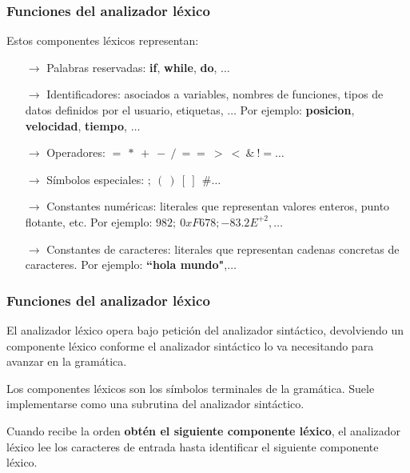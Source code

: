 \documentclass{beamer}
\begin{document}
		\begin{frame}
			\frametitle{Funciones del analizador l\'exico}

			\begin{block}{Estos componentes l\'exicos representan:}
			  \begin{itemize}
			      \item[$\rightarrow$] Palabras reservadas: \textbf{if}, \textbf{while}, \textbf{do}, $\ldots$
			      \item[$\rightarrow$] Identificadores: asociados a variables, nombres de funciones, tipos de datos definidos por el usuario, etiquetas, $\ldots$ Por ejemplo: \textbf{posicion}, \textbf{velocidad}, \textbf{tiempo}, $\ldots$
			      \item[$\rightarrow$] Operadores: $=~*~+~-~/~==~>~<~\&~!=\ldots$
			      \item[$\rightarrow$] S\'imbolos especiales: $;~(~)~[~]~{~}\#\ldots$
			      \item[$\rightarrow$] Constantes num\'ericas: literales que representan valores enteros, punto flotante, etc. Por ejemplo: $982;~0xF678;-83.2E^{+2},\ldots$
			      \item[$\rightarrow$] Constantes de caracteres: literales que representan cadenas concretas de caracteres. Por ejemplo: \textbf{``hola mundo"},$\ldots$
			  \end{itemize}
			\end{block}
		\end{frame}
		
		\begin{frame}
			\frametitle{Funciones del analizador l\'exico}

            \begin{block}{}
                El analizador l\'exico opera bajo petici\'on del analizador sint\'actico, devolviendo un componente l\'exico conforme el analizador sint\'actico lo va necesitando para avanzar en la gram\'atica.
            \end{block}
			\begin{block}{}
                Los componentes l\'exicos son los s\'imbolos terminales de la gram\'atica. Suele implementarse como una subrutina del analizador sint\'actico. 
            \end{block}
            \begin{block}{}
                Cuando recibe la orden \textbf{obt\'en el siguiente componente l\'exico}, el analizador l\'exico lee los caracteres de entrada hasta identificar el siguiente componente l\'exico.
            \end{block}
		\end{frame}		
		
\end{document}

